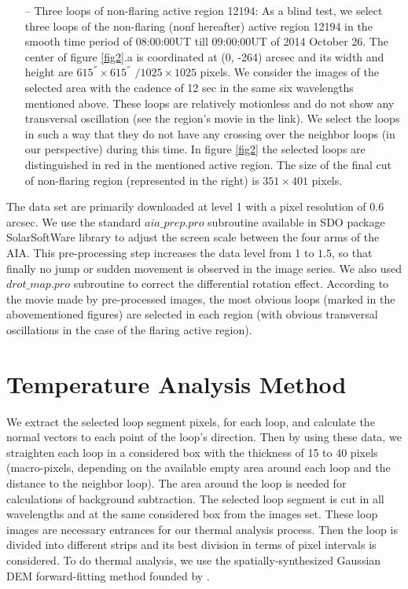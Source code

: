 \documentclass[oneside,onecolumn]{article}
\begin{document}
\begin{itemize}
\item[--]
Three loops of non-flaring active region 12194: As a blind test, we select three loops of the non-flaring (nonf hereafter) active region 12194 in the smooth time period of 08:00:00UT till 09:00:00UT of 2014 October 26. The center of figure \ref{fig2}.a is coordinated at (0, -264)  arcsec and its width and height are 
$615^{''}\times 615^{''}$ ${/}1025\times 1025$ pixels. We consider the images of the selected area with the cadence of 12 sec in the same six wavelengths mentioned above. These loops are relatively motionless and do not show any transversal oscillation (see the region's movie in the link). We select the loops in such a way that they do not have any crossing over the neighbor loops (in our perspective) during this time. In figure \ref{fig2} the selected loops are distinguished in red in the mentioned active region. The size of the final cut of non-flaring region (represented in the right) is $351\times 401$ pixels. 
\end{itemize}
The data set are primarily downloaded at level 1 with a pixel resolution of $0.6$ arcsec. 
We use the standard $aia{\_}prep.pro$ subroutine available in SDO package SolarSoftWare library to adjust the screen scale between the four arms of the AIA. This pre-processing step increases the data level from 1 to $1.5$, so that finally no jump or sudden movement is observed in the image series. We also used $drot{\_}map.pro$ subroutine to correct the differential rotation effect. 
 According to the movie made by pre-processed images, the most obvious loops (marked in the abovementioned figures) are selected in each region (with obvious transversal oscillations in the case of the flaring active region). 

\section{Temperature Analysis Method}
\label{sec:Analysis}

We extract the selected loop segment pixels, for each loop, and calculate the normal vectors to each point of the loop's direction. Then by using these data, we straighten each loop in a considered box with the thickness of 15 to 40 pixels (macro-pixels, depending on the available empty area around each loop and the distance to the neighbor loop). The area around the loop is needed for calculations of background subtraction. The selected loop segment is cut in all wavelengths and at the same considered box from the images set. These loop images are necessary entrances for our thermal analysis process. Then the loop is divided into different strips and its best division in terms of pixel intervals is considered. To do thermal analysis, we use the spatially-synthesized Gaussian DEM forward-fitting method founded by \citet{ref:Aschwanden2015}. 
\end{document}
